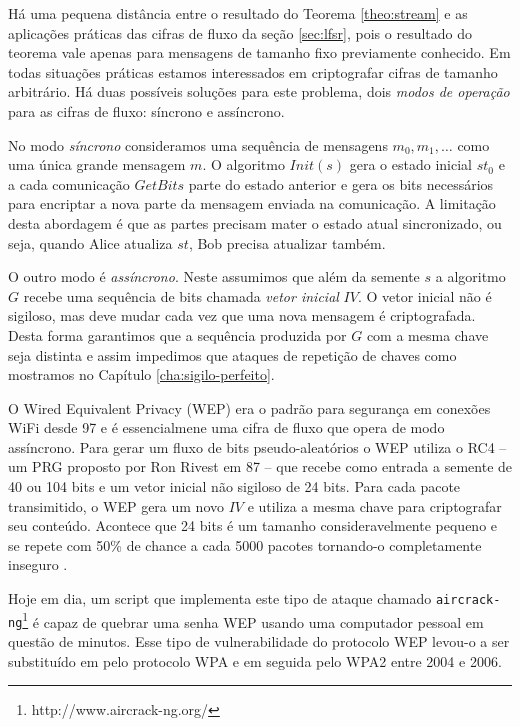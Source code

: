 Há uma pequena distância entre o resultado do Teorema \ref{theo:stream} e as aplicações práticas das cifras de fluxo da seção \ref{sec:lfsr}, pois o resultado do teorema vale apenas para mensagens de tamanho fixo previamente conhecido.
Em todas situações práticas estamos interessados em criptografar cifras de tamanho arbitrário.
Há duas possíveis soluções para este problema, dois {\em modos de operação} para as cifras de fluxo: síncrono e assíncrono.

No modo {\em síncrono} consideramos uma sequência de mensagens $m_0, m_1, \dots$ como uma única grande mensagem $m$.
O algoritmo $Init(s)$ gera o estado inicial $st_0$ e a cada comunicação $GetBits$ parte do estado anterior e gera os bits necessários para encriptar a nova parte da mensagem enviada na comunicação.
A limitação desta abordagem é que as partes precisam mater o estado atual sincronizado, ou seja, quando Alice atualiza $st$, Bob precisa atualizar também.

O outro modo é {\em assíncrono}.
Neste assumimos que além da semente $s$ a algoritmo $G$ recebe uma sequência de bits chamada {\em vetor inicial} $IV$.
O vetor inicial não é sigiloso, mas deve mudar cada vez que uma nova mensagem é criptografada.
Desta forma garantimos que a sequência produzida por $G$ com a mesma chave seja distinta e assim impedimos que ataques de repetição de chaves como mostramos no Capítulo \ref{cha:sigilo-perfeito}.


\begin{example}
O Wired Equivalent Privacy (WEP) era o padrão para segurança em conexões WiFi desde 97 e é essencialmene uma cifra de fluxo que opera de modo assíncrono.
Para gerar um fluxo de bits pseudo-aleatórios o WEP utiliza o RC4 \cite{Rivest16} -- um PRG proposto por Ron Rivest em 87 -- que recebe como entrada a semente de 40 ou 104 bits e um vetor inicial não sigiloso de 24 bits.
Para cada pacote transimitido, o WEP gera um novo $IV$ e utiliza a mesma chave para criptografar seu conteúdo.
Acontece que 24 bits é um tamanho consideravelmente pequeno e se repete com 50\% de chance a cada 5000 pacotes tornando-o completamente inseguro \cite{Fluhrer01}.

Hoje em dia, um script que implementa este tipo de ataque chamado {\tt aircrack-ng}\footnote{http://www.aircrack-ng.org/} é capaz de quebrar uma senha WEP usando uma computador pessoal em questão de minutos.
Esse tipo de vulnerabilidade do protocolo WEP levou-o a ser substituído em pelo protocolo WPA e em seguida pelo WPA2 entre 2004 e 2006.
\end{example}


